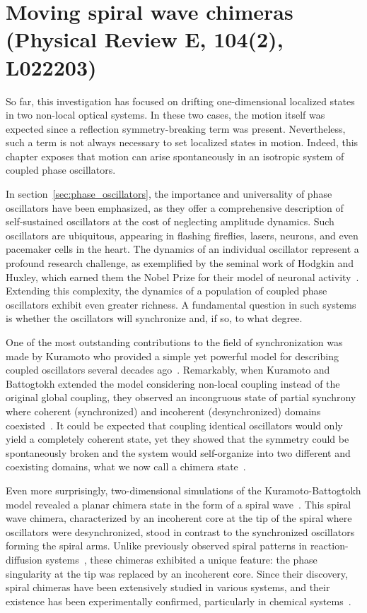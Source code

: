 \chapter{Moving spiral wave chimeras (Physical Review E, 104(2), L022203)}

\label{ch:spirals}

So far, this investigation has focused on drifting one-dimensional localized states in
two non-local optical systems. 
In these two cases, the motion itself was expected since a reflection
symmetry-breaking term was present. Nevertheless, such a term is not always
necessary to set localized states in motion. Indeed, this chapter exposes that motion can arise spontaneously
in an isotropic system of coupled phase oscillators.

In section~\ref{sec:phase_oscillators}, the importance and universality
of phase oscillators have been emphasized, as they offer a comprehensive
description of self-sustained oscillators at the cost of neglecting amplitude dynamics.
Such oscillators are ubiquitous, appearing in flashing fireflies, lasers, neurons,
and even pacemaker cells in the heart. The dynamics of an individual oscillator
represent a profound research challenge, as exemplified by the seminal work of Hodgkin
and Huxley, which earned them the Nobel Prize for their model of neuronal
activity~\cite{hodgkin1952quantitative}. Extending this complexity, the dynamics
of a population of coupled phase oscillators exhibit even greater richness.
A fundamental question in such systems is whether the oscillators will synchronize
and, if so, to what degree.

One of the most outstanding contributions to the field of synchronization was made
by Kuramoto who provided a simple yet powerful model 
for describing coupled oscillators several decades ago~\cite{kuramoto1975model}. 
Remarkably, when Kuramoto and Battogtokh extended the model considering non-local coupling instead
of the original global coupling, they observed an incongruous state
of partial synchrony where coherent (synchronized) and incoherent (desynchronized)
domains coexisted~\cite{kuramoto2002coexistence}.
It could be expected that coupling identical oscillators would only yield a completely coherent
state, yet they showed that the symmetry could be spontaneously broken and the system
would self-organize into two different and coexisting domains, what we now call a chimera state~\cite{abrams2004chimera}.

Even more surprisingly, two-dimensional simulations of the Kuramoto-Battogtokh model 
revealed a planar chimera state in the form of a spiral 
wave~\cite{kuramoto2003rotating,shima2004rotating}. 
This spiral wave chimera, characterized by an incoherent core at the tip of the
spiral where oscillators were desynchronized, stood in contrast to the synchronized
oscillators forming the spiral arms. Unlike previously observed spiral patterns in
reaction-diffusion systems~\cite{hagan1982spiral}, these chimeras exhibited a unique
feature: the phase singularity at the tip was replaced by an incoherent core.
Since their discovery, spiral chimeras have been extensively studied in various systems,
and their existence has been experimentally confirmed, particularly in chemical
systems~\cite{nkomo2013chimera,totz2018spiral}.


